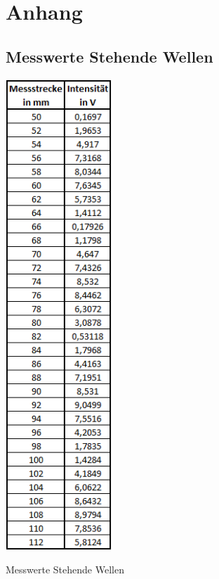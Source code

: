 \documentclass[a4paper]{scrartcl}
\numberwithin{equation}{subsection}
\begin{document}
\newpage
\section{Anhang}
\subsection{Messwerte Stehende Wellen}
\label{sec:MesswerteStehendeWellen}
\begin{table}[H]
\includegraphics[width=4cm]{Messwerte_Stehende_Wellen}
\centering
\caption{Messwerte Stehende Wellen}
\label{tab:MesswerteStehendeWellen}
\end{table}
\end{document}
